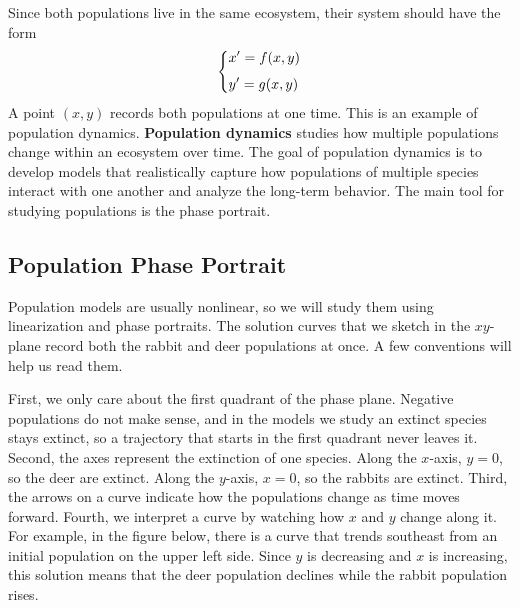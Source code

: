 \documentclass[10pt,letterpaper]{article}
\begin{document}
Since both populations live in the same ecosystem, their system should have the form
\[
\begin{dcases}
    x' = f(x,y)\\[4pt]
    y' = g(x,y)
\end{dcases}
\]
A point $(x,y)$ records both populations at one time. This is an example of population dynamics.
\textbf{Population dynamics} studies how multiple populations change within an ecosystem over time. 
The goal of population dynamics is to develop models that realistically capture how populations of multiple species interact with one another and analyze the long-term behavior. The main tool for studying populations is the phase portrait. 

\subsection{Population Phase Portrait}
Population models are usually nonlinear, so we will study them using linearization and phase portraits. The solution curves that we sketch in the $xy$-plane record both the rabbit and deer populations at once. A few conventions will help us read them.

First, we only care about the first quadrant of the phase plane. Negative populations do not make sense, and in the models we study an extinct species stays extinct, so a trajectory that starts in the first quadrant never leaves it. Second, the axes represent the extinction of one species. Along the $x$-axis, $y=0$, so the deer are extinct. Along the $y$-axis, $x=0$, so the rabbits are extinct. Third, the arrows on a curve indicate how the populations change as time moves forward. Fourth, we interpret a curve by watching how $x$ and $y$ change along it. For example, in the figure below, there is a curve that trends southeast from an initial population on the upper left side. Since $y$ is decreasing and $x$ is increasing, this solution means that the deer population declines while the rabbit population rises.
\end{document}
